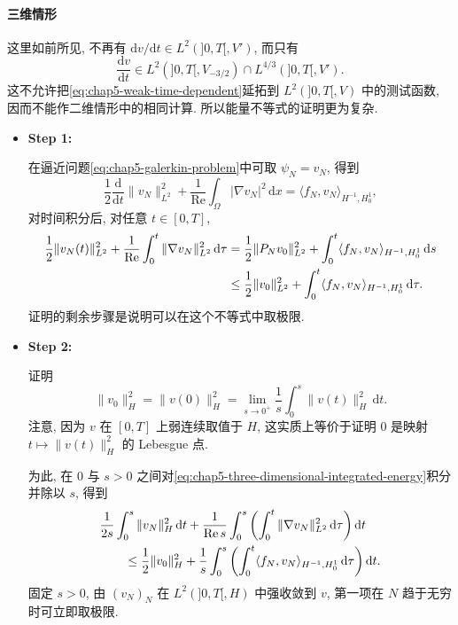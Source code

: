 \paragraph{三维情形}

这里如前所见, 不再有 $\mathrm dv/\mathrm dt\in L^2(]0,T[,V')$, 而只有
\[
 \frac{\mathrm dv}{\mathrm dt}\in L^2(]0,T[,V_{-3/2})\cap L^{4/3}(]0,T[,V').
\]
这不允许把\eqref{eq:chap5-weak-time-dependent}延拓到 $L^2(]0,T[,V)$ 中的测试函数, 因而不能作二维情形中的相同计算. 所以能量不等式的证明更为复杂.

\begin{itemize}
 \item \textbf{Step 1:}

 在逼近问题\eqref{eq:chap5-galerkin-problem}中可取 $\psi_N=v_N$, 得到
 \begin{equation}
  \frac12\frac{\mathrm d}{\mathrm dt}\|v_N\|_{L^2}^2
  +\frac1{\operatorname{Re}}\int_\Omega|\nabla v_N|^2\,\mathrm dx
  =\langle f_N,v_N\rangle_{H^{-1},H_0^1},
  \label{eq:chap5-three-dimensional-approx-energy}
 \end{equation}
 对时间积分后, 对任意 $t\in[0,T]$,
 \begin{align}
  \frac12\|v_N(t)\|_{L^2}^2
  +\frac1{\operatorname{Re}}\int_0^t\|\nabla v_N\|_{L^2}^2\,\mathrm d\tau
  &=\frac12\|P_Nv_0\|_{L^2}^2
  +\int_0^t\langle f_N,v_N\rangle_{H^{-1},H_0^1}\,\mathrm ds\notag\\
  &\leq\frac12\|v_0\|_{L^2}^2
  +\int_0^t\langle f_N,v_N\rangle_{H^{-1},H_0^1}\,\mathrm d\tau.
  \label{eq:chap5-three-dimensional-integrated-energy}
 \end{align}
 证明的剩余步骤是说明可以在这个不等式中取极限.

 \item \textbf{Step 2:}

 证明
 \begin{equation}
  \|v_0\|_H^2=\|v(0)\|_H^2
  =\lim_{s\to0^+}\frac1s\int_0^s\|v(t)\|_H^2\,\mathrm dt.
  \label{eq:chap5-initial-energy-average}
 \end{equation}
 注意, 因为 $v$ 在 $[0,T]$ 上弱连续取值于 $H$, 这实质上等价于证明 $0$ 是映射 $t\mapsto\|v(t)\|_H^2$ 的 Lebesgue 点.

 为此, 在 $0$ 与 $s>0$ 之间对\eqref{eq:chap5-three-dimensional-integrated-energy}积分并除以 $s$, 得到
 \begin{align}
  &\frac1{2s}\int_0^s\|v_N\|_H^2\,\mathrm dt
  +\frac1{\operatorname{Re}s}\int_0^s\left(\int_0^t\|\nabla v_N\|_{L^2}^2\,\mathrm d\tau\right)\mathrm dt\notag\\
  &\qquad\leq\frac12\|v_0\|_H^2
  +\frac1s\int_0^s\left(\int_0^t\langle f_N,v_N\rangle_{H^{-1},H_0^1}\,\mathrm d\tau\right)\mathrm dt.
  \label{eq:chap5-averaged-approx-energy}
 \end{align}
 固定 $s>0$, 由 $(v_N)_N$ 在 $L^2(]0,T[,H)$ 中强收敛到 $v$, 第一项在 $N$ 趋于无穷时可立即取极限.


\end{itemize}
